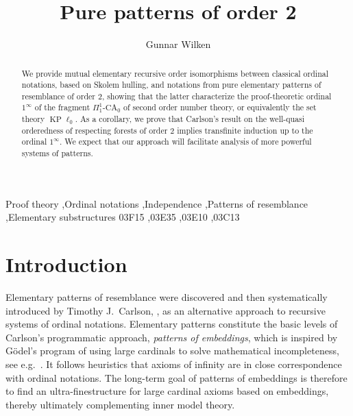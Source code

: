 \documentclass[3p,10pt,times]{elsarticle}
\newcommand{\kplnod}{{\operatorname{KP}\!\ell_0}}
\newcommand{\oneinf}{1^\infty}
\begin{document}
\begin{frontmatter}

\title{Pure patterns of order 2}


\author{Gunnar Wilken}


\address{Structural Cellular Biology Unit\\
Okinawa Institute of Science and Technology\\
1919-1 Tancha, Onna-son, 904-0495 Okinawa, Japan}


\begin{abstract}
We provide mutual elementary recursive order isomorphisms between classical ordinal notations, based on Skolem hulling, and
notations from pure elementary patterns of resemblance of order $2$,  
showing that the latter characterize the proof-theoretic ordinal $\oneinf$\index{$1$@$\oneinf$} of the fragment $\Pi^1_1$-$\mathrm{CA}_0$ 
of second order number theory, or equivalently the set theory $\kplnod$. 
As a corollary, we prove that Carlson's result on the well-quasi orderedness of respecting forests of order $2$ 
implies transfinite induction up to the ordinal $\oneinf$.
We expect that our approach will facilitate analysis of more powerful systems of patterns.
\end{abstract}

\begin{keyword}
Proof theory \sep Ordinal notations \sep Independence \sep Patterns of resemblance \sep Elementary substructures 
\MSC[2010] 03F15 \sep 03E35 \sep 03E10 \sep 03C13 
\end{keyword}

\end{frontmatter}


\section{Introduction}
Elementary patterns of resemblance were discovered and then systematically introduced by Timothy J.\ Carlson, \cite{C00,C01,C09}, 
as an alternative approach to recursive systems of ordinal notations. Elementary patterns constitute the basic levels of Carlson's 
programmatic approach, {\it patterns of embeddings}, which is inspired by G\"odel's program of using large cardinals to solve mathematical incompleteness, see e.g.\ \cite{F96,K09}. It follows heuristics that axioms of infinity are
in close correspondence with ordinal notations. The long-term goal of patterns of embeddings is therefore to find an ultra-finestructure for large cardinal axioms based on embeddings, thereby ultimately complementing inner model theory.
\end{document}
